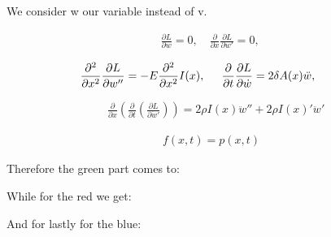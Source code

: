 We consider w our variable instead of v.

\begin{equation}
    \begin{split}
        &\frac{\partial L}{\partial w} = 0, \quad \frac{\partial}{\partial x}\frac{\partial L}{\partial w'} = 0, \quad    
    \end{split}
\end{equation}

\begin{equation}
    \begin{split}
        &\frac{\partial^2}{\partial x^2}\frac{\partial L}{\partial w''} = -E\frac{\partial^2}{\partial x^2}I(x), \hspace{0.5cm} \frac{\partial}{\partial t}\frac{\partial L}{\partial \dot w} = 2\delta A(x)\ddot w, \hspace{0.5cm}
    \end{split}
\end{equation}

\begin{equation}
    \begin{split}
        &\frac{\partial}{\partial x}\left(\frac{\partial}{\partial t}\left(\frac{\partial L}{\partial \dot w'}\right)\right) = 2\rho I(x) \ddot w'' + 2\rho I(x)' \ddot w'
    \end{split}
\end{equation}

\begin{equation}
    \begin{split}
        f(x,t) = p(x,t)
    \end{split}
\end{equation}

Therefore the green part comes to:

While for the red we get:

And for lastly for the blue:



